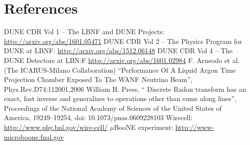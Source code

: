 \documentclass[a4paper]{jpconf}
\begin{document}
\section*{References}
\begin{thebibliography}{9}
 DUNE CDR Vol 1 -- The LBNF and DUNE Projects: \url{http://arxiv.org/abs/1601.05471}
 DUNE CDR Vol 2 -- The Physics Program for DUNE at LBNF: \url{http://arxiv.org/abs/1512.06148}
  DUNE CDR Vol 4 -- The DUNE Detectors at LBN:F \url{http://arxiv.org/abs/1601.02984}
  F. Arneodo et al. (The ICARUS-Milano Collaboration) ``Performance Of A Liquid Argon Time Projection Chamber Exposed To The WANF Neutrino Beam'', Phys.Rev.D74:112001,2006
  William H. Press, `` Discrete Radon transform has an exact, fast inverse and generalizes to operations other than sums along lines'', Proceedings of the National Academy of Sciences of the United States of America, 19249–19254, doi: 10.1073/pnas.0609228103
 Wirecell: \url{http://www.phy.bnl.gov/wire-cell/}
 $\mu$BooNE experiment: \url{http://www-microboone.fnal.gov}

\end{thebibliography}
\end{document}
